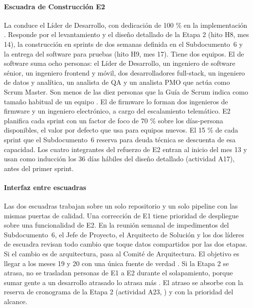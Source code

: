 \paragraph{Escuadra de Construcción E2}
La conduce el Líder de Desarrollo, con dedicación de 100 \% en la implementación
. Responde por el levantamiento y el diseño detallado de la Etapa 2 (hito H8,
mes 14), la construcción en sprints de dos semanas definida en el Subdocumento~6 y la entrega del
software para pruebas (hito H9, mes 17). Tiene dos equipos. El de software suma ocho personas: el Líder
de Desarrollo, un ingeniero de software sénior, un ingeniero frontend y móvil, dos desarrolladores
full-stack, un ingeniero de datos y analítica, un analista de QA y un analista PMO que actúa como Scrum
Master. Son menos de las diez personas que la Guía de Scrum indica como tamaño habitual de un equipo
\parencite{schwaber2020}. El de firmware lo forman dos ingenieros de firmware y un ingeniero
electrónico, a cargo del escalamiento telemático. E2 planifica cada sprint con un factor de foco de
70 \% sobre los días-persona disponibles, el valor por defecto que \textcite{kniberg2015} usa para
equipos nuevos. El 15 \% de cada sprint que el Subdocumento~6 reserva para deuda técnica se descuenta
de esa capacidad. Los cuatro integrantes del refuerzo de E2 entran al inicio del mes 13 y usan como
inducción los 36 días hábiles del diseño detallado (actividad A17), antes del primer sprint.

\paragraph{Interfaz entre escuadras}
Las dos escuadras trabajan sobre un solo repositorio y un solo pipeline con las mismas puertas de
calidad. Una corrección de E1 tiene prioridad de despliegue sobre una funcionalidad de E2. En la
reunión semanal de impedimentos del Subdocumento~6, el Jefe de Proyecto, el Arquitecto de Solución y
los dos líderes de escuadra revisan todo cambio que toque datos compartidos por las dos etapas. Si el
cambio es de arquitectura, pasa al Comité de Arquitectura. El objetivo es llegar a los meses 19 y 20
con una única fuente de verdad . Si la Etapa 2 se atrasa, no se trasladan personas de
E1 a E2 durante el solapamiento, porque sumar gente a un desarrollo atrasado lo atrasa más
\parencite{brooks1975}. El atraso se absorbe con la reserva de cronograma de la Etapa 2 (actividad
A23, ) y con la prioridad del alcance.

